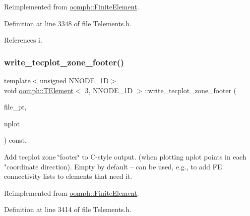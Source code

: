 Reimplemented from \hyperlink{classoomph_1_1FiniteElement_ac3987a5ead7dc20c63d86b333466e2b5}{oomph\+::\+Finite\+Element}.



Definition at line 3348 of file Telements.\+h.



References i.

\mbox{\label{classoomph_1_1TElement_3_013_00_01NNODE__1D_01_4_a973cf0f35d33832837a620f3d7ac464f}} 
\subsubsection{\texorpdfstring{write\+\_\+tecplot\+\_\+zone\+\_\+footer()}{write\_tecplot\_zone\_footer()}\hspace{0.1cm}{\footnotesize\ttfamily [2/2]}}
{\footnotesize\ttfamily template$<$unsigned N\+N\+O\+D\+E\+\_\+1D$>$ \\
void \hyperlink{classoomph_1_1TElement}{oomph\+::\+T\+Element}$<$ 3, N\+N\+O\+D\+E\+\_\+1D $>$\+::write\+\_\+tecplot\+\_\+zone\+\_\+footer (\begin{DoxyParamCaption}\item[{F\+I\+LE $\ast$}]{file\+\_\+pt,  }\item[{const unsigned \&}]{nplot }\end{DoxyParamCaption}) const\hspace{0.3cm}{\ttfamily [inline]}, {\ttfamily [virtual]}}



Add tecplot zone \char`\"{}footer\char`\"{} to C-\/style output. (when plotting nplot points in each "coordinate direction). Empty by default -- can be used, e.\+g., to add FE connectivity lists to elements that need it. 



Reimplemented from \hyperlink{classoomph_1_1FiniteElement_a03e50fc04226b7fb7641e053d6fd97bf}{oomph\+::\+Finite\+Element}.



Definition at line 3414 of file Telements.\+h.




